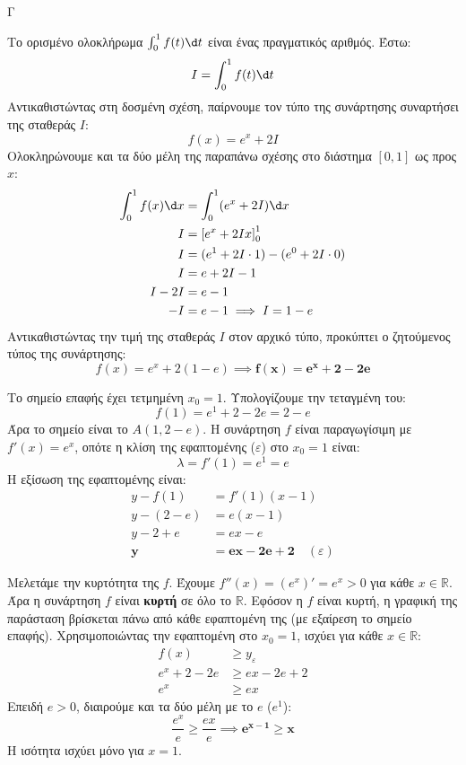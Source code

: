 \begin{thema}{Γ}
\begin{erwthma}
\item Το ορισμένο ολοκλήρωμα $\int_0^1 f(t) \d t$ είναι ένας πραγματικός αριθμός. Έστω:
\[ I = \int_0^1 f(t) \d t \]
Αντικαθιστώντας στη δοσμένη σχέση, παίρνουμε τον τύπο της συνάρτησης συναρτήσει της σταθεράς $I$:
\[ f(x) = e^x + 2I \]
Ολοκληρώνουμε και τα δύο μέλη της παραπάνω σχέσης στο διάστημα $[0, 1]$ ως προς $x$:
\begin{align*}
\int_0^1 f(x) \d x &= \int_0^1 (e^x + 2I) \d x \\
I &= \left[ e^x + 2Ix \right]_0^1 \\
I &= (e^1 + 2I \cdot 1) - (e^0 + 2I \cdot 0) \\
I &= e + 2I - 1 \\
I - 2I &= e - 1 \\
-I &= e - 1 \implies I = 1 - e
\end{align*}
Αντικαθιστώντας την τιμή της σταθεράς $I$ στον αρχικό τύπο, προκύπτει ο ζητούμενος τύπος της συνάρτησης:
\[ f(x) = e^x + 2(1 - e) \implies \boldsymbol{f(x) = e^x + 2 - 2e} \]

\item Το σημείο επαφής έχει τετμημένη $x_0 = 1$. Υπολογίζουμε την τεταγμένη του:
\[ f(1) = e^1 + 2 - 2e = 2 - e \]
Άρα το σημείο είναι το $A(1, 2-e)$.
Η συνάρτηση $f$ είναι παραγωγίσιμη με $f'(x) = e^x$, οπότε η κλίση της εφαπτομένης ($\varepsilon$) στο $x_0=1$ είναι:
\[ \lambda = f'(1) = e^1 = e \]
Η εξίσωση της εφαπτομένης είναι:
\begin{align*}
y - f(1) &= f'(1)(x - 1) \\
y - (2 - e) &= e(x - 1) \\
y - 2 + e &= ex - e \\
\boldsymbol{y} &\boldsymbol{= ex - 2e + 2} \quad (\varepsilon)
\end{align*}

Μελετάμε την κυρτότητα της $f$. Έχουμε $f''(x) = (e^x)' = e^x > 0$ για κάθε $x \in \mathbb{R}$.
Άρα η συνάρτηση $f$ είναι \textbf{κυρτή} σε όλο το $\mathbb{R}$.
Εφόσον η $f$ είναι κυρτή, η γραφική της παράσταση βρίσκεται πάνω από κάθε εφαπτομένη της (με εξαίρεση το σημείο επαφής).
Χρησιμοποιώντας την εφαπτομένη στο $x_0 = 1$, ισχύει για κάθε $x \in \mathbb{R}$:
\begin{align*}
f(x) &\ge y_{\varepsilon} \\
e^x + 2 - 2e &\ge ex - 2e + 2 \\
e^x &\ge ex
\end{align*}
Επειδή $e > 0$, διαιρούμε και τα δύο μέλη με το $e$ ($e^1$):
\[ \frac{e^x}{e} \ge \frac{ex}{e} \implies \boldsymbol{e^{x-1} \ge x} \]
Η ισότητα ισχύει μόνο για $x = 1$.


\end{erwthma}
\end{thema}
